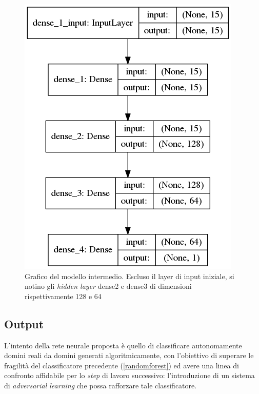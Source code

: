 \begin{figure}[htb]
    \centering
    \includegraphics[width=.6\columnwidth]{figures/pieraz_baseline.png}
    \caption{Grafico del modello intermedio. Escluso il layer di input iniziale, si notino gli \textit{hidden layer} dense2 e dense3 di dimensioni rispettivamente 128 e 64 }
\label{fig:pieraz}
\end{figure}

\subsection{Output}
\label{classificatorennoutput}
L'intento della rete neurale proposta è quello di classificare autonomamente domini reali da domini generati algoritmicamente, con l'obiettivo di superare le fragilità del classificatore precedente (\ref{randomforest}) ed avere una linea di confronto affidabile per lo \textit{step} di lavoro successivo: l'introduzione di un sistema di \textit{adversarial learning} che possa rafforzare tale classificatore. 

